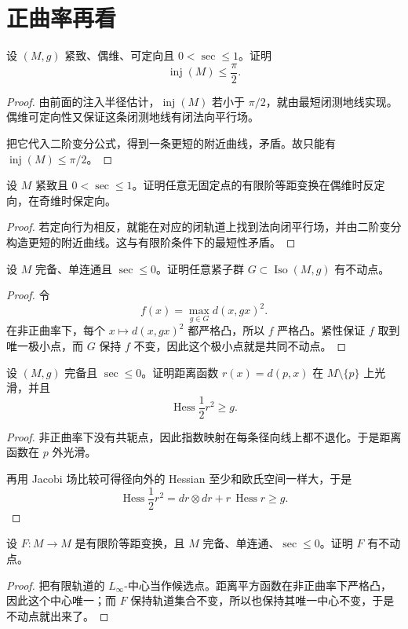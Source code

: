 \documentclass[11pt,a4paper,openany]{ctexbook}
\numberwithin{equation}{chapter}
\begin{document}
\section{正曲率再看}

\begin{problem}
设 \((M,g)\) 紧致、偶维、可定向且 \(0<\sec\le 1\)。证明
\[
\operatorname{inj}(M)\le \frac{\pi}{2}.
\]
\end{problem}
\begin{proof}
由前面的注入半径估计，\(\operatorname{inj}(M)\) 若小于 \(\pi/2\)，就由最短闭测地线实现。偶维可定向性又保证这条闭测地线有闭法向平行场。

把它代入二阶变分公式，得到一条更短的附近曲线，矛盾。故只能有 \(\operatorname{inj}(M)\le \pi/2\)。
\end{proof}

\begin{problem}
设 \(M\) 紧致且 \(0<\sec\le 1\)。证明任意无固定点的有限阶等距变换在偶维时反定向，在奇维时保定向。
\end{problem}
\begin{proof}
若定向行为相反，就能在对应的闭轨道上找到法向闭平行场，并由二阶变分构造更短的附近曲线。这与有限阶条件下的最短性矛盾。
\end{proof}

\begin{problem}
设 \(M\) 完备、单连通且 \(\sec\le 0\)。证明任意紧子群 \(G\subset \operatorname{Iso}(M,g)\) 有不动点。
\end{problem}
\begin{proof}
令
\[
f(x)=\max_{g\in G} d(x,gx)^2.
\]
在非正曲率下，每个 \(x\mapsto d(x,gx)^2\) 都严格凸，所以 \(f\) 严格凸。紧性保证 \(f\) 取到唯一极小点，而 \(G\) 保持 \(f\) 不变，因此这个极小点就是共同不动点。
\end{proof}

\begin{exercise}
设 \((M,g)\) 完备且 \(\sec\le 0\)。证明距离函数 \(r(x)=d(p,x)\) 在 \(M\setminus\{p\}\) 上光滑，并且
\[
\operatorname{Hess}\frac12 r^2\ge g.
\]
\end{exercise}
\begin{proof}
非正曲率下没有共轭点，因此指数映射在每条径向线上都不退化。于是距离函数在 \(p\) 外光滑。

再用 Jacobi 场比较可得径向外的 Hessian 至少和欧氏空间一样大，于是
\[
\operatorname{Hess}\frac12 r^2=dr\otimes dr+r\,\operatorname{Hess}r\ge g.
\]
\end{proof}

\begin{exercise}
设 \(F\colon M\to M\) 是有限阶等距变换，且 \(M\) 完备、单连通、\(\sec\le 0\)。证明 \(F\) 有不动点。
\end{exercise}
\begin{proof}
把有限轨道的 \(L_\infty\)-中心当作候选点。距离平方函数在非正曲率下严格凸，因此这个中心唯一；而 \(F\) 保持轨道集合不变，所以也保持其唯一中心不变，于是不动点就出来了。
\end{proof}
\end{document}
